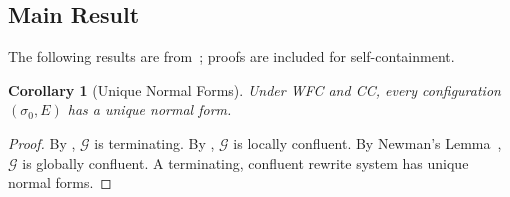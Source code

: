 \documentclass[11pt,a4paper]{article}
\theoremstyle{plain}
\newtheorem{corollary}[theorem]{Corollary}
\theoremstyle{definition}
\theoremstyle{remark}
\renewcommand{\_}{\textunderscore\allowbreak}
\begin{document}
\subsection{Main Result}

The following results are from~\cite{blackwell2026nc}; proofs are included
for self-containment.

\begin{corollary}[Unique Normal Forms]
\label{cor:unique-nf}
Under WFC and CC, every configuration $(\sigma_0, E)$ has a unique normal
form.
\end{corollary}
\begin{proof}
By , $\mathcal{G}$ is terminating.  By
, $\mathcal{G}$ is locally confluent.  By Newman's
Lemma~\cite{newman1942}, $\mathcal{G}$ is globally confluent.  A terminating,
confluent rewrite system has unique normal forms.
\end{proof}
\end{document}
